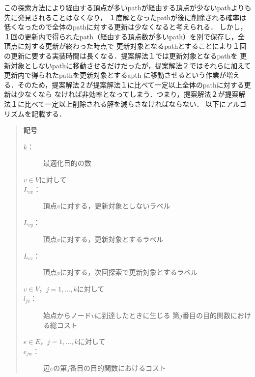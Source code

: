 \documentclass[12pt]{optlab-bachelor}
\begin{document}
この探索方法により経由する頂点が多いpathが経由する頂点が少ないpathよりも先に発見されることはなくなり，
１度解となったpathが後に削除される確率は低くなったので全体のpathに対する更新は少なくなると考えられる．
しかし，１回の更新内で得られたpath（経由する頂点数が多いpath）を別で保存し，全頂点に対する更新が終わった時点で
更新対象となるpathとすることにより１回の更新に要する実装時間は長くなる．提案解法１では更新対象となるpathを
更新対象としないpathに移動させるだけだったが，提案解法２ではそれらに加えて更新内で得られたpathを更新対象とするapth
に移動させるという作業が増える．そのため，提案解法２が提案解法１に比べて一定以上全体のpathに対する更新は少なくなら
なければ非効率となってしまう．つまり，提案解法２が提案解法１に比べて一定以上削除される解を減らさなければならない．
以下にアルゴリズムを記載する．

\begin{quote}
  \textbf{記号}
  \begin{description}
    \item[$k$：] 最適化目的の数
    \item[$v \in V$に対して]
    \item[$L_{vx}$：] 頂点$v$に対する，更新対象としないラベル
    \item[$L_{vy}$：] 頂点$v$に対する，更新対象とするラベル
    \item[$L_{vz}$：] 頂点$v$に対する，次回探索で更新対象とするラベル
    \item[$v \in V$，$j = 1 , \ldots , k$に対して]
    \item[$l_{jv}$：] 始点からノード$v$に到達したときに生じる
    第$j$番目の目的関数における総コスト
    \item[$e \in E$，$j = 1 , \ldots , k$に対して]
    \item[$e_{jw}$：] 辺$e$の第$j$番目の目的関数におけるコスト
  \end{description}
\end{quote}
\end{document}
